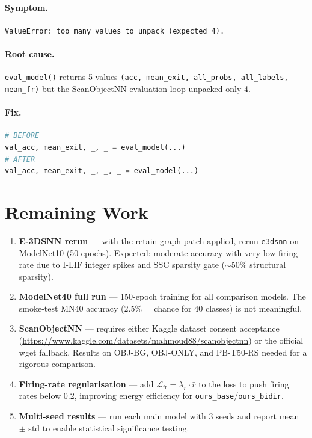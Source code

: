 \documentclass[11pt,a4paper]{article}
\begin{document}
\paragraph{Symptom.} \texttt{ValueError: too many values to unpack (expected 4).}

\paragraph{Root cause.} \texttt{eval\_model()} returns 5 values
\texttt{(acc, mean\_exit, all\_probs, all\_labels, mean\_fr)} but the
ScanObjectNN evaluation loop unpacked only 4.

\paragraph{Fix.}
\begin{lstlisting}[language=Python]
# BEFORE
val_acc, mean_exit, _, _ = eval_model(...)
# AFTER
val_acc, mean_exit, _, _, _ = eval_model(...)
\end{lstlisting}

\section{Remaining Work}

\begin{enumerate}
  \item \textbf{E-3DSNN rerun} --- with the retain-graph patch applied, rerun
        \texttt{e3dsnn} on ModelNet10 (50 epochs). Expected: moderate accuracy
        with very low firing rate due to I-LIF integer spikes and SSC sparsity
        gate ($\sim$50\% structural sparsity).

  \item \textbf{ModelNet40 full run} --- 150-epoch training for all comparison
        models. The smoke-test MN40 accuracy (2.5\% = chance for 40 classes)
        is not meaningful.

  \item \textbf{ScanObjectNN} --- requires either Kaggle dataset consent
        acceptance (\url{https://www.kaggle.com/datasets/mahmoud88/scanobjectnn})
        or the official wget fallback. Results on OBJ-BG, OBJ-ONLY, and
        PB-T50-RS needed for a rigorous comparison.

  \item \textbf{Firing-rate regularisation} --- add
        $\mathcal{L}_\text{fr} = \lambda_r \cdot \bar{r}$ to the loss to push
        firing rates below 0.2, improving energy efficiency for
        \texttt{ours\_base}/\texttt{ours\_bidir}.

  \item \textbf{Multi-seed results} --- run each main model with 3 seeds and
        report mean $\pm$ std to enable statistical significance testing.
\end{enumerate}
\end{document}
